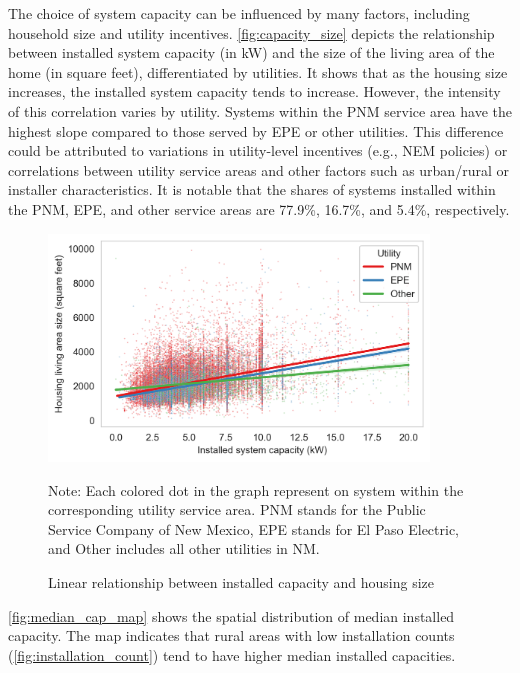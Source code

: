 \documentclass[11pt,twoside,letterpaper]{article}
\begin{document}
The choice of system capacity can be influenced by many factors, including household size and utility incentives. \autoref{fig:capacity_size} depicts the relationship between installed system capacity (in kW) and the size of the living area of the home (in square feet), differentiated by utilities. It shows that as the housing size increases, the installed system capacity tends to increase. However, the intensity of this correlation varies by utility. Systems within the PNM service area have the highest slope compared to those served by EPE or other utilities. This difference could be attributed to variations in utility-level incentives (e.g., NEM policies) or correlations between utility service areas and other factors such as urban/rural or installer characteristics. It is notable that the shares of systems installed within the PNM, EPE, and other service areas are 77.9\%, 16.7\%, and 5.4\%, respectively.
 
\begin{figure}[!ht]
    \centering
\includegraphics[width=0.9\textwidth]{figures/capacity_house_size.png}
    \caption{Linear relationship between installed capacity and housing size}
    \label{fig:capacity_size}
        \begin{flushleft}
        \footnotesize Note: Each colored dot in the graph represent on system within the corresponding utility service area. PNM stands for the Public Service Company of New Mexico, EPE stands for El Paso Electric, and Other includes all other utilities in NM.
    \end{flushleft}
\end{figure}

\autoref{fig:median_cap_map} shows the spatial distribution of median installed capacity. The map indicates that rural areas with low installation counts (\autoref{fig:installation_count}) tend to have higher median installed capacities.
\end{document}

